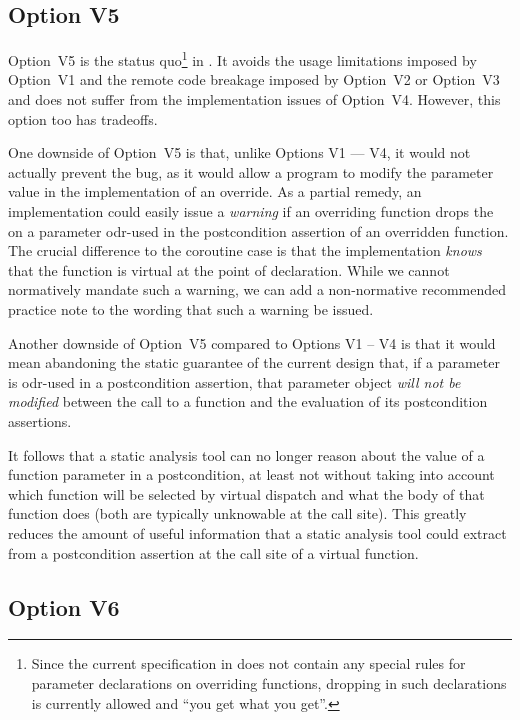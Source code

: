 \subsection*{Option V5}

Option~V5 is the status quo\footnote{Since the current specification in \cite{P2900R10} does not contain any special rules for parameter declarations on overriding functions, dropping  in such declarations is currently allowed and ``you get what you get''.} in \cite{P2900R10}. It avoids the usage limitations imposed by Option~V1 and the remote code breakage imposed by Option~V2 or Option~V3 and does not suffer from the implementation issues of Option~V4. However, this option too has tradeoffs.

One downside of Option~V5 is that, unlike Options V1 --- V4, it would not actually prevent the bug, as it would allow a program to modify the parameter value in the implementation of an override. As a partial remedy, an implementation could easily issue a \emph{warning} if an overriding function drops the  on a parameter odr-used in the postcondition assertion of an overridden function. The crucial difference to the coroutine case is that the implementation \emph{knows} that the function is virtual at the point of declaration. While we cannot normatively mandate such a warning, we can add a non-normative recommended practice note to the wording that such a warning be issued. 

Another downside of Option~V5 compared to Options V1 -- V4 is that it would mean abandoning the static guarantee of the current \cite{P2900R10} design that, if a parameter is odr-used in a postcondition assertion, that parameter object \emph{will not be modified} between the call to a function and the evaluation of its postcondition assertions.

It follows that a static analysis tool can no longer reason about the value of a function parameter in a postcondition, at least not without taking into account which function will be selected by virtual dispatch and what the body of that function does (both are typically unknowable at the call site). This greatly reduces the amount of useful information that a static analysis tool could extract from a postcondition assertion at the call site of a virtual function.

\subsection*{Option V6}

